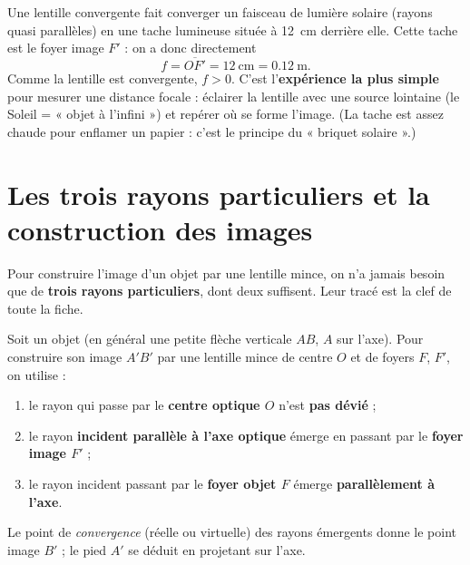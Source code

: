 \documentclass[11pt,a4paper]{article}
\begin{document}
\begin{exemple}
Une lentille convergente fait converger un faisceau de lumière solaire (rayons quasi parallèles) en
une tache lumineuse située à \SI{12}{\centi\metre} derrière elle. Cette tache est le foyer image
$F'$ : on a donc directement
\[ f=\overline{OF'}=\SI{12}{\centi\metre}=\SI{0.12}{\metre}. \]
Comme la lentille est convergente, $f>0$. C'est l'\textbf{expérience la plus simple} pour mesurer une
distance focale : éclairer la lentille avec une source lointaine (le Soleil = « objet à l'infini »)
et repérer où se forme l'image. (La tache est assez chaude pour enflamer un papier : c'est le
principe du « briquet solaire ».)
\end{exemple}

\section{Les trois rayons particuliers et la construction des images}
Pour construire l'image d'un objet par une lentille mince, on n'a jamais besoin que de \textbf{trois
rayons particuliers}, dont deux suffisent. Leur tracé est la clef de toute la fiche.

\begin{theoreme}
Soit un objet (en général une petite flèche verticale $AB$, $A$ sur l'axe). Pour construire son image
$A'B'$ par une lentille mince de centre $O$ et de foyers $F$, $F'$, on utilise :
\begin{enumerate}[label=(\roman*),leftmargin=2.2em,topsep=2pt]
  \item le rayon qui passe par le \textbf{centre optique $O$} n'est \textbf{pas dévié} ;
  \item le rayon \textbf{incident parallèle à l'axe optique} émerge en passant par le \textbf{foyer
        image $F'$} ;
  \item le rayon incident passant par le \textbf{foyer objet $F$} émerge \textbf{parallèlement à l'axe}.
\end{enumerate}
Le point de \emph{convergence} (réelle ou virtuelle) des rayons émergents donne le point image $B'$ ;
le pied $A'$ se déduit en projetant sur l'axe.
\end{theoreme}
\end{document}
